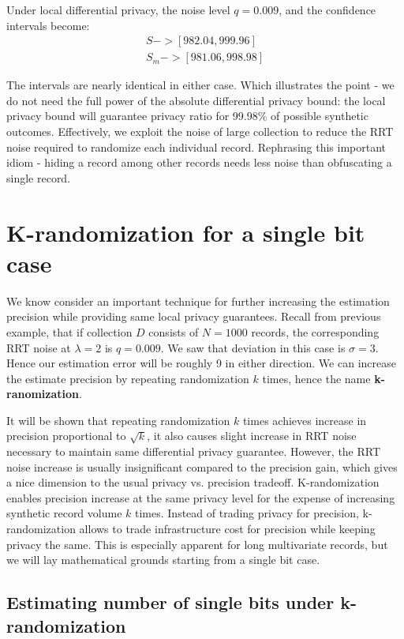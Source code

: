 \documentclass[11pt,draft]{article}
\begin{document}
Under local differential privacy, the noise level $q= 0.009$, and the confidence intervals become:
\begin{align}
S -> [982.04 , 999.96] \\
S_m -> [981.06 , 998.98]
\end{align}

The intervals are nearly identical in either case.  Which illustrates the point - we do not need the full power of the absolute differential privacy bound: the local privacy bound will guarantee privacy ratio for 99.98\% of possible synthetic outcomes.  Effectively, we exploit the noise of large collection to reduce the RRT noise required to randomize each individual record.  Rephrasing this important idiom - hiding a record among other records needs less noise than obfuscating a single record.


\section{K-randomization for a single bit case}

We know consider an important technique for further increasing the estimation precision while providing same local privacy guarantees.  Recall from previous example, that if collection $D$ consists of $N=1000$ records, the corresponding RRT noise at $\lambda = 2$ is $q=0.009$.  We saw that deviation in this case is $\sigma=3$.  Hence our estimation error will be roughly 9 in either direction.   We can increase the estimate precision by  repeating randomization $k$ times, hence the name  \textbf{k-ranomization}.  

It will be shown that repeating randomization $k$ times achieves increase in precision proportional to $\sqrt{k}$,  it also causes slight increase in RRT noise necessary to maintain same differential privacy guarantee.  However, the RRT noise increase is usually insignificant compared to the precision gain, which gives a nice dimension to the usual privacy vs. precision tradeoff.  K-randomization enables precision increase at the same privacy level for the expense of increasing synthetic record volume $k$ times.  Instead of trading privacy for precision, k-randomization allows to trade infrastructure cost for precision while keeping privacy the same.  This is especially apparent for long multivariate records,  but we will lay mathematical grounds starting from a single bit case.

\subsection{Estimating number of single bits under k-randomization}
\end{document}
